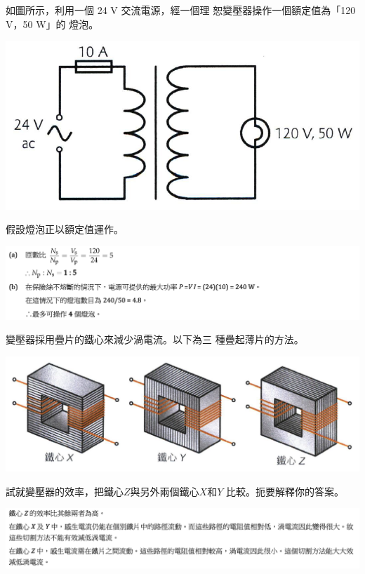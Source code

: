 {
    如圖所示，利用一個 24 V 交流電源，經一個理 恕變壓器操作一個額定值為「120 V，50 W」的 燈泡。
    \par{\par\centering\includegraphics[width=.4\textwidth]{./img/ch_ACtransformer_lq_2024-06-17-20-02-32.png}\par}
    假設燈泡正以額定值運作。
}{
    \par{\par\centering\includegraphics[width=\textwidth]{./img/ch_ACtransformer_lq_2024-06-17-20-37-52.png}\par}
}

{
    變壓器採用疊片的鐵心來減少渦電流。以下為三 種疊起薄片的方法。
    \par{\par\centering\includegraphics[width=.7\textwidth]{./img/ch_ACtransformer_lq_2024-06-17-20-03-59.png}\par}
    試就變壓器的效率，把鐵心$Z$與另外兩個鐵心$X$和$Y$ 比較。扼要解釋你的答案。
}{
    \par{\par\centering\includegraphics[width=\textwidth]{./img/ch_ACtransformer_lq_2024-06-17-20-38-16.png}\par}
}

